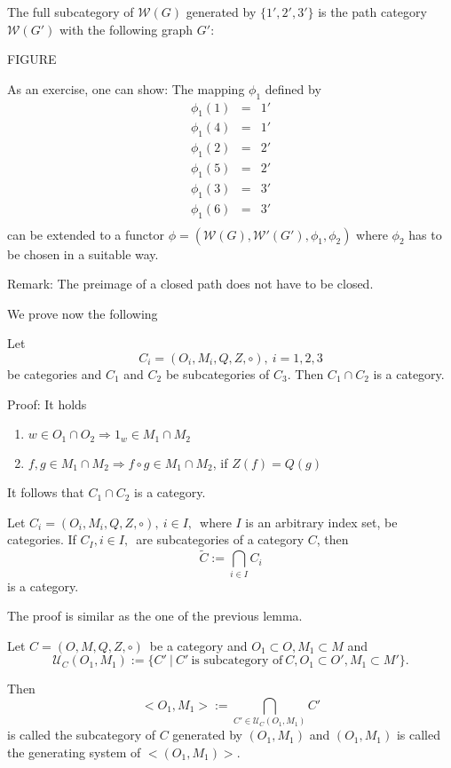 The full subcategory of $\mathcal{W}(G)$ generated by $\{ 1', 2', 3' \}$ is the
path category $\mathcal{W}(G')$ with the following graph $G'$:

FIGURE

As an exercise, one can show: The mapping $\phi_1$ defined by 
\begin{eqnarray*}
\phi_1(1) & = & 1' \\
\phi_1(4) & = & 1' \\
\phi_1(2) & = & 2' \\
\phi_1(5) & = & 2' \\
\phi_1(3) & = & 3' \\
\phi_1(6) & = & 3' \\
\end{eqnarray*}
can be extended to a functor $\phi = (\mathcal{W}(G), \mathcal{W'}(G'),
\phi_1, \phi_2)$ where $\phi_2$ has to be chosen in a suitable way.

Remark: The preimage of a closed path does not have to be closed.

We prove now the following
\begin{lemma}
Let \[ C_i = (O_i, M_i, Q, Z, \circ),\ i = 1, 2, 3 \] be categories and $C_1$
and $C_2$ be subcategories of $C_3$. Then $C_1 \cap C_2$ is a category.
\end{lemma}

Proof: It holds
\begin{enumerate}
  \item $w \in O_1 \cap O_2 \Rightarrow 1_w \in M_1 \cap M_2$
  \item $f, g \in M_1 \cap M_2 \Rightarrow f \circ g \in M_1 \cap M_2$, if
  $Z(f) = Q(g)$
\end{enumerate}

It follows that $C_1 \cap C_2$ is a category.

\begin{lemma}
Let $ C_i = (O_i, M_i, Q, Z, \circ),\ i \in I,$\ where $I$ is an arbitrary
index set, be categories. If $C_I, i \in I,$\ are subcategories of a category
$C$, then \[ \tilde{C} := \bigcap_{i \in I} C_i \] is a category.
\end{lemma}

The proof is similar as the one of the previous lemma.

\begin{definition}

Let $C = (O, M, Q, Z, \circ)$\ be a category and $O_1 \subset O, M_1 \subset M$
and \[ \mathcal{U}_C(O_1, M_1) := \{ C'\ |\ C'\ \mbox{is subcategory of}\ C, O_1
\subset O', M_1 \subset M' \}. \]

Then \[ {<}O_1, M_1{>} := \bigcap_{C' \in \mathcal{U}_C(O_1, M_1)} C' \] is
called the subcategory of $C$ generated by $(O_1, M_1)$ and $(O_1, M_1)$ is called the
generating system of ${<}(O_1, M_1){>}$.
\end{definition}

